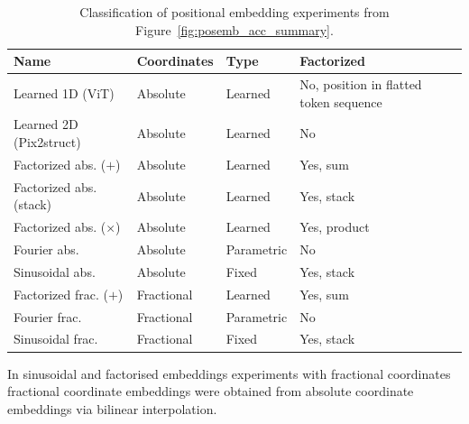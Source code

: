 \begin{table}[ht]
  \caption{Classification of positional embedding experiments from Figure~\ref{fig:posemb_acc_summary}.}
  \centering

\begin{tabular}{llll}
\toprule
       Name & Coordinates &  Type & Factorized \\
\midrule

    Learned 1D (ViT)             & Absolute & Learned & No, position in flatted token sequence \\
    Learned 2D (Pix2struct)      & Absolute & Learned & No \\
    Factorized abs. ($+$)        & Absolute & Learned & Yes, sum \\
    Factorized abs. (stack)      & Absolute & Learned & Yes, stack \\
    Factorized abs. ($\times$)   & Absolute & Learned & Yes, product \\
    Fourier abs.                 & Absolute & Parametric & No \\
    Sinusoidal abs.              & Absolute & Fixed & Yes, stack \\
    Factorized frac. ($+$)       & Fractional & Learned & Yes, sum \\
    Fourier frac.                & Fractional & Parametric & No \\
    Sinusoidal frac.             & Fractional & Fixed & Yes, stack \\
\bottomrule
\end{tabular}

In sinusoidal and factorised embeddings experiments with fractional coordinates fractional coordinate embeddings were obtained from absolute coordinate embeddings via bilinear interpolation.

  \label{app:tbl:posemb}
\end{table}